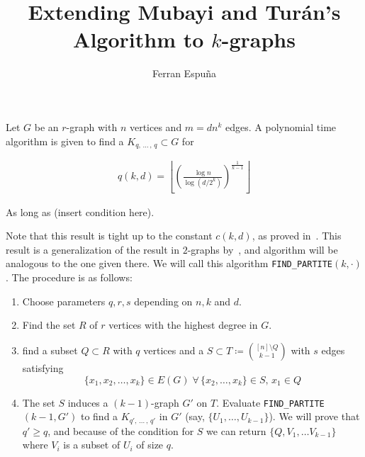 \documentclass[12pt]{article}
\author{Ferran Espuña}
\date{} %
\begin{document}
    \title{Extending Mubayi and Turán's Algorithm to $k$-graphs}

    \maketitle

    Let $G$ be an $r$-graph with $n$ vertices and $m = dn^k$ edges.
    A polynomial time algorithm is given to find a $K_{q,\, \ldots\, ,\, q} \subset G$ for

    \begin{align*}
        q (k, d) = \left\lfloor \left(  \frac{\log n}{\log (d/2^k)} \right)^{\frac{1}{k-1}} \right\rfloor
        \label{eq:q}
    \end{align*}

    As long as (insert condition here). %
    
    Note that this result is tight up to the constant $c(k, d)$,
    as proved in~\cite{Erods1964}.
    This result is a generalization of the result in $2$-graphs by~\cite{MUBAYI2010174},
    and algorithm will be analogous to the one given there.
    We will call this algorithm \verb|FIND_PARTITE|$(k, \cdot)$.
    The procedure is as follows:

    \begin{enumerate}
        \item Choose parameters $q, r, s$ depending on $n, k$ and $d$. \label{step:choose_parameters}
        \item Find the set $R$ of $r$ vertices with the highest degree in $G$. \label{step:find_R}

        \item find a subset $Q \subset R$ with $q$ vertices and a
        $S \subset T \coloneqq \binom{[n] \setminus Q}{k-1}$ with $s$ edges satisfying
        \[\{x_1, x_2, \ldots, x_k\} \in E(G) \; \forall \, \{x_2, \ldots, x_k\} \in S, \, x_1 \in Q\] \label{step:find_Q_S}

        \item The set $S$ induces a $(k-1)$-graph $G'$ on $T$.
        Evaluate \verb|FIND_PARTITE|$(k-1, G')$ to find a $K_{q',\, \ldots\, ,\, q'}$ in $G'$
        (say, $\{U_1, \ldots, U_{k-1}\}$). We will prove that $q' \geq q$,
        and because of the condition for $S$ we can return $\{Q, V_1, \ldots V_{k-1}\}$
        where $V_i$ is a subset of $U_i$ of size $q$.

    \end{enumerate}
\end{document}

